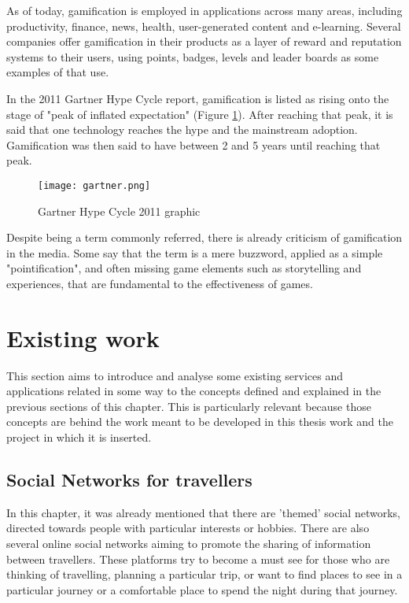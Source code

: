 As of today, gamification is employed in applications across many areas, including productivity, finance, news, health, user-generated content and e-learning. Several companies offer gamification in their products as a layer of reward and reputation systems to their users, using points, badges, levels and leader boards as some examples of that use. 

In the 2011 Gartner Hype Cycle report, gamification is listed as rising onto the stage of "peak of inflated expectation" (Figure \ref{fig:gart}). After reaching that peak, it is said that one technology reaches the hype and the mainstream adoption. Gamification was then said to have between 2 and 5 years until reaching that peak.

\begin{figure}[h!]
  \begin{center}
    \leavevmode
    \texttt{[image: gartner.png]}
    \caption{Gartner Hype Cycle 2011 graphic}
    \label{fig:gart}
  \end{center}
\end{figure}

Despite being a term commonly referred, there is already criticism of gamification in the media. Some say that the term is a mere buzzword, applied as a simple "pointification", and often missing game elements such as storytelling and experiences, that are fundamental to the effectiveness of games.


\section{Existing work}

This section aims to introduce and analyse some existing services and applications related in some way to the concepts defined and explained in the previous sections of this chapter. This is particularly relevant because those concepts are behind the work meant to be developed in this thesis work and the project in which it is inserted.

\subsection{Social Networks for travellers}

In this chapter, it was already mentioned that there are 'themed' social networks, directed towards
people with particular interests or hobbies. 
There are also several online social networks aiming to promote the sharing of information between travellers. These platforms try to become a must see for those who are thinking of travelling, planning a particular trip, or want to find places to see in a particular journey or a comfortable place to spend the night during that journey.

